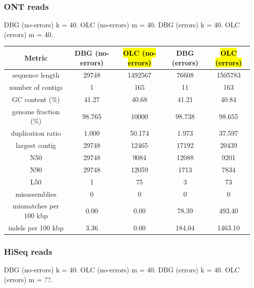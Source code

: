 \documentclass[12pt]{article}
\begin{document}
\subsubsection{ONT reads}
DBG (no-errors) k = 40. OLC (no-errors) m = 40.
DBG (errors) k = 40. OLC (errors) m = 40.
\begin{center}
\begin{tabular}{ |c|c|c||c|c| }
    \hline
    Metric               & DBG (no-errors) & \hl{OLC (no-errors)} & DBG (errors) & \hl{OLC (errors)} \\
    \hline
    sequence length      & 29748  & 1492567  & 76608 & 1505783 \\
    number of contigs    & 1      & 165      & 11 & 163 \\
    GC content (\%)      & 41.27  & 40.68    & 41.21 & 40.84 \\
    genome fraction (\%) & 98.765 & 10000    & 98.738 & 98.655 \\
    duplication ratio    & 1.000  & 50.174   & 1.973 & 37.597 \\
    largest contig       & 29748  & 12465    & 17192 & 20439 \\
    N50                  & 29748  & 9084     & 12088 & 9201 \\
    N90                  & 29748  & 12059    & 1713 & 7834 \\
    L50                  & 1      & 75       & 3 & 73 \\
    misassemblies        & 0      & 0        & 0 & 0 \\
    mismatches per 100 kbp & 0.00 & 0.00     & 78.39 & 493.40 \\
    indels per 100 kbp   & 3.36   & 0.00     & 184.04 & 1463.10  \\
    \hline
\end{tabular}
\end{center}

\subsubsection{HiSeq reads}
DBG (no-errors) k = 40. OLC (no-errors) m = 40.
DBG (errors) k = 40. OLC (errors) m = ??.
\end{document}
